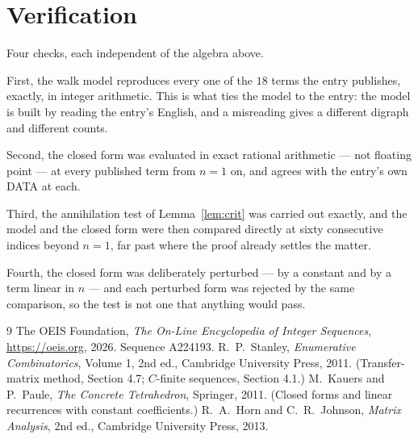\documentclass[11pt,a4paper]{article}
\theoremstyle{plain}
\theoremstyle{definition}
\begin{document}
\section{Verification}

Four checks, each independent of the algebra above.

First, the walk model reproduces every one of the $18$ terms the entry publishes,
exactly, in integer arithmetic. This is what ties the model to the entry: the model is built
by reading the entry's English, and a misreading gives a different digraph and different
counts.

Second, the closed form was evaluated in exact rational arithmetic --- not floating point ---
at every published term from $n=1$ on, and agrees with the entry's own DATA at each.

Third, the annihilation test of Lemma~\ref{lem:crit} was carried out exactly, and the model
and the closed form were then compared directly at sixty consecutive indices beyond
$n=1$, far past where the proof already settles the matter.

Fourth, the closed form was deliberately perturbed --- by a constant and by a term linear in
$n$ --- and each perturbed form was rejected by the same comparison, so the test is not one
that anything would pass.

\begin{thebibliography}{9}
 The OEIS Foundation, \emph{The On-Line Encyclopedia of Integer
Sequences}, \url{https://oeis.org}, 2026. Sequence A224193.
 R.~P.~Stanley, \emph{Enumerative Combinatorics}, Volume 1, 2nd ed.,
Cambridge University Press, 2011. (Transfer-matrix method, Section 4.7; $C$-finite sequences,
Section 4.1.)
 M.~Kauers and P.~Paule, \emph{The Concrete Tetrahedron}, Springer, 2011.
(Closed forms and linear recurrences with constant coefficients.)
 R.~A.~Horn and C.~R.~Johnson, \emph{Matrix Analysis}, 2nd ed., Cambridge
University Press, 2013.
\end{thebibliography}
\end{document}
